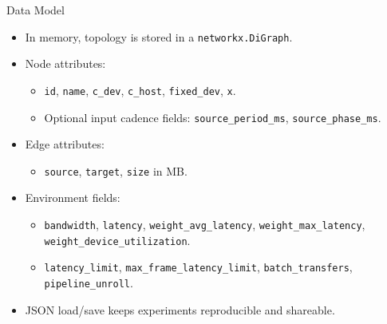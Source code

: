 \documentclass[aspectratio=169]{beamer}
\begin{document}
\begin{frame}{Data Model}
  \begin{itemize}
    \item In memory, topology is stored in a \texttt{networkx.DiGraph}.
    \item Node attributes:
      \begin{itemize}
        \item \texttt{id}, \texttt{name}, \texttt{c\_dev}, \texttt{c\_host}, \texttt{fixed\_dev}, \texttt{x}.
        \item Optional input cadence fields: \texttt{source\_period\_ms}, \texttt{source\_phase\_ms}.
      \end{itemize}
    \item Edge attributes:
      \begin{itemize}
        \item \texttt{source}, \texttt{target}, \texttt{size} in MB.
      \end{itemize}
    \item Environment fields:
      \begin{itemize}
        \item \texttt{bandwidth}, \texttt{latency}, \texttt{weight\_avg\_latency}, \texttt{weight\_max\_latency}, \texttt{weight\_device\_utilization}.
        \item \texttt{latency\_limit}, \texttt{max\_frame\_latency\_limit}, \texttt{batch\_transfers}, \texttt{pipeline\_unroll}.
      \end{itemize}
    \item JSON load/save keeps experiments reproducible and shareable.
  \end{itemize}
\end{frame}
\end{document}
